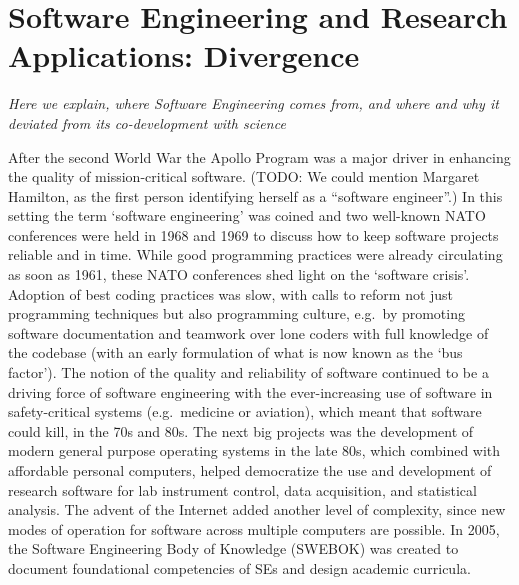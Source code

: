 \documentclass[
        twocolumn,german,biblatex
    ]{article}
\begin{document}
    \section{Software Engineering and Research Applications:
    Divergence}\label{software-engineering-and-research-applications-divergence}

    \emph{Here we explain, where Software Engineering comes from, and
    where and why it deviated from its co-development with science}

    After the second World War the Apollo Program was a major driver in
    enhancing the quality of mission-critical software. (TODO: We could
    mention Margaret Hamilton, as the first person identifying herself
    as a ``software engineer''.) In this setting the term `software
    engineering' was coined\autocite{Randell1979} and two well-known
    NATO conferences were held in 1968\autocite{Naur1969} and
    1969\autocite{Buxton1970} to discuss how to keep software projects
    reliable and in time. While good programming practices were already
    circulating as soon as 1961\autocite{Hosier1961}, these NATO
    conferences shed light on the `software
    crisis'\autocite{Randell1979}. Adoption of best coding practices was
    slow\autocite{Boehm1979}, with calls to reform not just programming
    techniques but also programming
    culture\autocite{Weinberg1971,Boehm1979}, e.g.~by promoting software
    documentation and teamwork over lone coders with full knowledge of
    the codebase\autocite[100]{Weinberg1971} (with an early
    formulation\autocite[114]{Weinberg1971} of what is now known as the
    `bus factor'\autocite{Zazworka2010,Jabrayilzade2022}). The notion of
    the quality and reliability of software continued to be a driving
    force of software engineering with the ever-increasing use of
    software in safety-critical systems (e.g.~medicine or aviation),
    which meant that software could kill, in the 70s and 80s. The next
    big projects was the development of modern general purpose operating
    systems in the late 80s, which combined with affordable personal
    computers, helped democratize the use and development of research
    software for lab instrument control, data acquisition, and
    statistical analysis\autocite{Robinson1984}. The advent of the
    Internet added another level of complexity, since new modes of
    operation for software across multiple computers are possible. In
    2005, the Software Engineering Body of Knowledge (SWEBOK) was
    created to document foundational competencies of
    SEs\autocite{SWEBOK2005} and design academic
    curricula\autocite{Fairley2014}.
\end{document}
